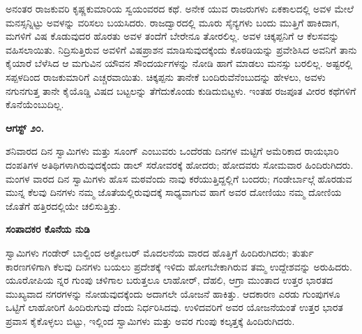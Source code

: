 ಅನಂತರ ರಾಜಕುವರಿ ಕೃಷ್ಣಕುಮಾರಿಯ ಸ್ವಯಂವರದ ಕಥೆ. ಅನೇಕ ಯುವ ರಾಜರುಗಳು ಏಕಕಾಲದಲ್ಲಿ ಅವಳ ಮೇಲೆ ಮನಸ್ಸನ್ನಿಟ್ಟು ಅವಳನ್ನು ವರಿಸಲು ಬಯಸಿದರು. ರಾಜದ್ವಾರದಲ್ಲಿ ಮೂರು ಸೈನ್ಯಗಳು ಬಂದು ಮುತ್ತಿಗೆ ಹಾಕಿದಾಗ, ಮಗಳಿಗೆ ವಿಷ ಕೊಡುವುದರ ಹೊರತು ಅವಳ ತಂದೆಗೆ ಬೇರೇನೂ ತೋರಲಿಲ್ಲ. ಅವಳ ಚಿಕ್ಕಪ್ಪನಿಗೆ ಆ ಕೆಲಸವನ್ನು ವಹಿಸಲಾಯಿತು. ನಿದ್ರಿಸುತ್ತಿರುವ ಅವಳಿಗೆ ವಿಷಪ್ರಾಶನ ಮಾಡಿಸುವುದಕ್ಕೆಂದು ಕೊಠಡಿಯನ್ನು ಪ್ರವೇಶಿಸಿದ ಅವನಿಗೆ ತಾನು ಕೈಯಾರೆ ಬೆಳೆಸಿದ ಆ ಮಗುವಿನ ಯೌವನ ಸೌಂದರ್ಯಗಳನ್ನು ನೋಡಿ ಹಾಗೆ ಮಾಡಲು ಮನಸ್ಸು ಬರಲಿಲ್ಲ. ಅಷ್ಟರಲ್ಲಿ ಸಪ್ಪಳದಿಂದ ರಾಜಕುಮಾರಿಗೆ ಎಚ್ಚರವಾಯಿತು. ಚಿಕ್ಕಪ್ಪನು ತಾನೇಕೆ ಬಂದಿರುವೆನೆಂಬುದನ್ನು ಹೇಳಲು, ಅವಳು ನಗುನಗುತ್ತ ತಾನೇ ಕೈಯೊಡ್ಡಿ ವಿಷದ ಬಟ್ಟಲನ್ನು ತೆಗೆದುಕೊಂಡು ಕುಡಿದುಬಿಟ್ಟಳು. ಇಂತಹ ರಜಪೂತ ವೀರರ ಕಥೆಗಳಿಗೆ ಕೊನೆಯೆಂಬುದಿಲ್ಲ.

\textbf{ಆಗಸ್ಟ್ ೨೦.}

ಶನಿವಾರದ ದಿನ ಸ್ವಾಮಿಗಳು ಮತ್ತು ಸೂಂಗ್ ಎಂಬುವರು ಒಂದೆರಡು ದಿನಗಳ ಮಟ್ಟಿಗೆ ಅಮೆರಿಕಾದ ರಾಯಭಾರಿ ದಂಪತಿಗಳ ಅತಿಥಿಗಳಾಗಿರುವುದಕ್ಕೆಂದು ಡಾಲ್ ಸರೋವರಕ್ಕೆ ಹೋದರು; ಹೋದವರು ಸೋಮವಾರ ಹಿಂದಿರುಗಿದರು. ಮಂಗಳ ವಾರದ ದಿನ ಸ್ವಾಮಿಗಳು ಹೊಸ ಮಠವೆಂದು ನಾವು ಕರೆಯುತ್ತಿದ್ದಲ್ಲಿಗೆ ಬಂದರು; ಗಂಡೇರ್ಬಾಲ್ಗೆ ಹೊರಡುವ ಮುನ್ನ ಕೆಲವು ದಿನಗಳು ನಮ್ಮ ಜೊತೆಯಲ್ಲಿರುವುದಕ್ಕೆ ಸಾಧ್ಯವಾಗುವ ಹಾಗೆ ಅವರ ದೋಣಿಯು ನಮ್ಮ ದೋಣಿಯ ಜೊತೆಗೆ ಹತ್ತಿರದಲ್ಲಿಯೇ ಚಲಿಸುತ್ತಿತ್ತು.

\begin{center}
\textbf{ಸಂಪಾದಕರ ಕೊನೆಯ ನುಡಿ}
\end{center}

ಸ್ವಾಮಿಗಳು ಗಂಡೇರ್ ಬಾಲ್ದಿಂದ ಅಕ್ಟೋಬರ್ ಮೊದಲನೆಯ ವಾರದ ಹೊತ್ತಿಗೆ ಹಿಂದಿರುಗಿದರು; ತುರ್ತು ಕಾರಣಗಳಿಗಾಗಿ ಕೆಲವು ದಿನಗಳು ಬಯಲು ಪ್ರದೇಶಕ್ಕೆ ಇಳಿದು ಹೋಗಬೇಕಾಗಿರುವ ತಮ್ಮ ಉದ್ದೇಶವನ್ನು ಅರುಹಿದರು. ಯೂರೋಪಿಯ ನ್ನರ ಗುಂಪು ಚಳಿಗಾಲ ಬರುತ್ತಲೂ ಲಾಹೋರ್, ದೆಹಲಿ, ಆಗ್ರಾ ಮುಂತಾದ ಉತ್ತರ ಭಾರತದ ಮುಖ್ಯವಾದ ನಗರಗಳನ್ನು ನೋಡುವುದಕ್ಕೆಂದು ಅದಾಗಲೇ ಯೋಜನೆ ಹಾಕಿತ್ತು. ಆದಕಾರಣ ಎರಡು ಗುಂಪುಗಳೂ ಒಟ್ಟಿಗೆ ಲಾಹೋರಿಗೆ ಹಿಂದಿರುಗುವು ದೆಂದು ನಿರ್ಧರಿಸಿದವು. ಉಳಿದವರಿಗೆ ಅವರ ಯೋಜನೆಯಂತೆ ಉತ್ತರ ಭಾರತ ಪ್ರವಾಸ ಕೈಕೊಳ್ಳಲು ಬಿಟ್ಟು, ಇಲ್ಲಿಂದ ಸ್ವಾಮಿಗಳು ಮತ್ತು ಅವರ ಗುಂಪು ಕಲ್ಕತ್ತಕ್ಕೆ ಹಿಂದಿರುಗಿದರು.

